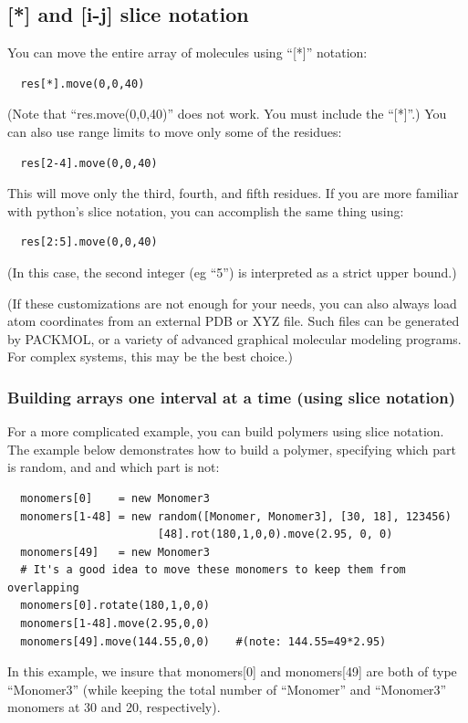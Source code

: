 \documentclass[11pt]{article}
\begin{document}
\subsection{[*] and [i-j] slice notation}
\label{sec:array_wildcards_intro}
You can move the entire array of molecules using ``[*]'' notation:
\begin{verbatim}
  res[*].move(0,0,40)
\end{verbatim}
(Note that ``res.move(0,0,40)'' does not work.
 You must include the ``[*]''.)
You can also use range limits to move only some of the residues:
\begin{verbatim}
  res[2-4].move(0,0,40)
\end{verbatim}
This will move only the third, fourth, and fifth residues.
If you are more familiar with python's slice notation, you can 
accomplish the same thing using:
\begin{verbatim}
  res[2:5].move(0,0,40)
\end{verbatim}
(In this case, the second integer (eg ``5'') is interpreted as a 
 strict upper bound.)

(If these customizations
 are not enough for your needs, you can also always load atom 
coordinates from an external PDB or XYZ file.
Such files can be generated by PACKMOL, 
or a variety of advanced graphical molecular modeling programs. 
For complex systems, this may be the best choice.)




\subsubsection{Building arrays one interval at a time (using slice notation)}

For a more complicated example, you can build polymers using slice notation.
The example below demonstrates how to build a polymer,
specifying which part is random, and and which part is not:

\begin{verbatim}
  monomers[0]    = new Monomer3
  monomers[1-48] = new random([Monomer, Monomer3], [30, 18], 123456)
                       [48].rot(180,1,0,0).move(2.95, 0, 0)
  monomers[49]   = new Monomer3
  # It's a good idea to move these monomers to keep them from overlapping
  monomers[0].rotate(180,1,0,0)
  monomers[1-48].move(2.95,0,0)
  monomers[49].move(144.55,0,0)    #(note: 144.55=49*2.95)
\end{verbatim}
In this example, we insure that monomers[0] and monomers[49] are both
of type ``Monomer3'' 
(while keeping the total number of ``Monomer'' and ``Monomer3'' monomers at 
 30 and 20, respectively).
\end{document}
